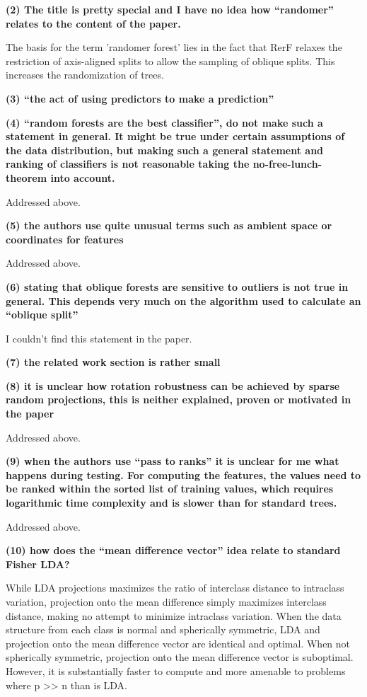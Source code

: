 {\textbf{(2) The title is pretty special and I have no idea how ``randomer'' relates to the content of the paper.}

The basis for the term 'randomer forest' lies in the fact that RerF relaxes the restriction of axis-aligned splits to allow the sampling of oblique splits. This increases the randomization of trees.

\textbf{(3) ``the act of using predictors to make a prediction''}
 
\textbf{(4) ``random forests are the best classifier'', do not make such a statement in general. It might be true under certain assumptions of the data distribution,
but making such a general statement and ranking of classifiers is not reasonable taking the no-free-lunch-theorem into account.}

Addressed above.

\textbf{(5) the authors use quite unusual terms such as ambient space or coordinates for features}

Addressed above.

\textbf{(6) stating that oblique forests are sensitive to outliers is not true in general. This depends very much on the algorithm used to calculate an ``oblique split''}

I couldn't find this statement in the paper.

\textbf{(7) the related work section is rather small}

\textbf{(8) it is unclear how rotation robustness can be achieved by sparse random projections, this is neither explained, proven or motivated in the paper}

Addressed above.

\textbf{(9) when the authors use ``pass to ranks'' it is unclear for me what happens during testing. For computing the features, the values need to be ranked within the sorted list of training values, which requires logarithmic time complexity and is slower than for standard trees.}

Addressed above.

\textbf{(10) how does the ``mean difference vector'' idea relate to standard Fisher LDA?}

While LDA projections maximizes the ratio of interclass distance to intraclass variation, projection onto the mean difference simply maximizes interclass distance, making no attempt to minimize intraclass variation. When the data structure from each class is normal and spherically symmetric, LDA and projection onto the mean difference vector are identical and optimal. When not spherically symmetric, projection onto the mean difference vector is suboptimal. However, it is substantially faster to compute and more amenable to problems where p >> n than is LDA.

}
